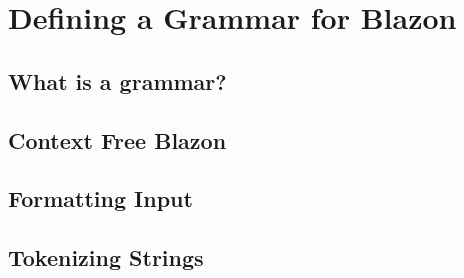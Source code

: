 \chapter{Defining a Grammar for Blazon}

\section{What is a grammar?}

\section{Context Free Blazon}

\section{Formatting Input}

\section{Tokenizing Strings} 
